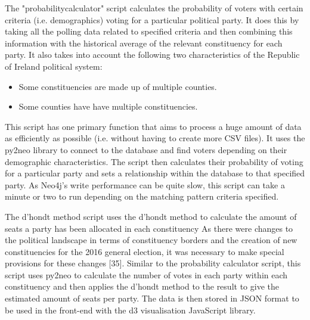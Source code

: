 The "probability\textunderscore calculator" script calculates the probability of voters with certain criteria (i.e. demographics) voting for a particular political party. It does this by taking all the polling data related to specified criteria and then combining this information with the historical average of the relevant constituency for each party.  It also takes into account the following two characteristics of the Republic of Ireland political system:
\begin{itemize}
	\item Some constituencies are made up of multiple counties.
	\item Some counties have have multiple constituencies.
\end{itemize}
This script has one primary function that aims to process a huge amount of data as efficiently as possible (i.e. without having to create more CSV files). It uses the py2neo library to connect to the database and find voters depending on their demographic characteristics. The script then calculates their probability of voting for a particular party and sets a relationship within the database to that  specified party. As Neo4j’s write performance can be quite slow, this script can take a minute or two to run depending on the matching pattern criteria specified.

The d’hondt method script uses the d’hondt method to calculate the amount of seats a party has been allocated in each constituency As there were changes to the political landscape in terms of constituency borders and the creation of new constituencies for the 2016 general election, it was necessary to make special provisions for these changes [35].  Similar to the probability calculator script, this script uses py2neo to calculate the number of votes in each party within each constituency and then applies the d’hondt method to the result to give the estimated amount of seats per party. The data is then stored in JSON format to be used in the front-end with the d3 visualisation JavaScript library. 
\pagebreak

